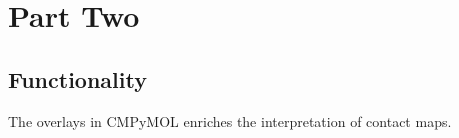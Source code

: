 \documentclass[11pt,fleqn]{book} %
\begin{document}










\part{Part Two}



\chapter{Functionality}

The overlays in CMPyMOL enriches the interpretation of contact maps.
\end{document}
